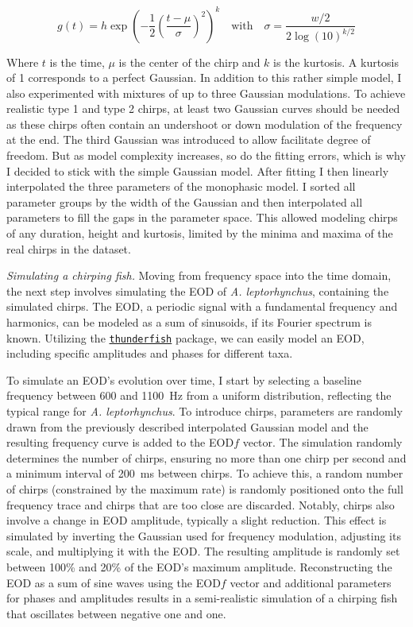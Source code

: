 \begin{equation}
  g(t) = h \exp\left(-\frac{1}{2}\left(\frac{t - \mu}{\sigma}\right)^{2}\right)^{k} \quad \text{with} \quad
  \sigma = \frac{w / 2}{2 \log(10)^{k/2}}
\end{equation}

Where $t$ is the time, $\mu$ is the center of the chirp and $k$ is the
kurtosis. A kurtosis of 1 corresponds to a perfect Gaussian. In addition to
this rather simple model, I also experimented with mixtures of up to three
Gaussian modulations. To achieve realistic type 1 and type 2 chirps, at least
two Gaussian curves should be needed as these chirps often contain an
undershoot or down modulation of the frequency at the end. The third Gaussian
was introduced to allow facilitate degree of freedom. But as model complexity
increases, so do the fitting errors, which is why I decided to stick with the
simple Gaussian model. After fitting I then linearly interpolated the three
parameters of the monophasic model. I sorted all parameter groups by the width
of the Gaussian and then interpolated all parameters to fill the gaps in the
parameter space. This allowed modeling chirps of any duration, height and
kurtosis, limited by the minima and maxima of the real chirps in the dataset.

\emph{Simulating a chirping fish.}\label{sec:simulatingachirpingfish} Moving
from frequency space into the time domain, the next step involves simulating
the EOD of \textit{A. leptorhynchus}, containing the simulated chirps. The EOD,
a periodic signal with a fundamental frequency and harmonics, can be modeled as
a sum of sinusoids, if its Fourier spectrum is known. Utilizing the
\href{https://github.com/janscience/thunderfish/}{\texttt{thunderfish}}
package, we can easily model an EOD, including specific amplitudes and phases
for different taxa.

To simulate an EOD's evolution over time, I start by selecting a baseline
frequency between 600 and \SI{1100}{Hz} from a uniform distribution, reflecting
the typical range for \textit{A. leptorhynchus}. To introduce chirps,
parameters are randomly drawn from the previously described interpolated
Gaussian model and  the resulting frequency curve is added to the EOD$f$
vector. The simulation randomly determines the number of chirps, ensuring no
more than one chirp per second and a minimum interval of
\SI{200}{\milli\second} between chirps. To achieve this, a random number of
chirps (constrained by the maximum rate) is randomly positioned onto the full
frequency trace and chirps that are too close are discarded.  Notably, chirps
also involve a change in EOD amplitude, typically a slight reduction. This
effect is simulated by inverting the Gaussian used for frequency modulation,
adjusting its scale, and multiplying it with the EOD. The resulting amplitude
is randomly set between 100\% and 20\% of the EOD's maximum amplitude.
Reconstructing the EOD as a sum of sine waves using the EOD$f$ vector and
additional parameters for phases and amplitudes results in a semi-realistic
simulation of a chirping fish that oscillates between negative one and one.

